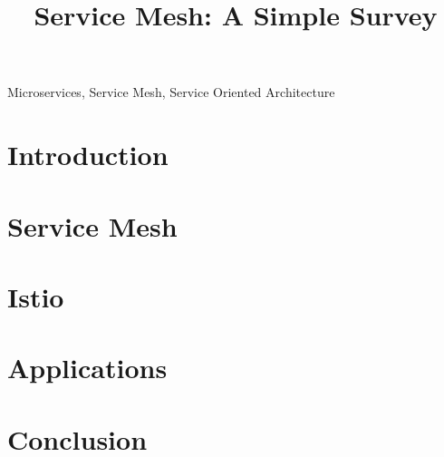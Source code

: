 \documentclass[conference]{IEEEtran}
\begin{document}
\title{Service Mesh: A Simple Survey}

\iffalse
\author{\IEEEauthorblockN{1\textsuperscript{st} Given Name Surname}
  \IEEEauthorblockA{\textit{dept. name of organization (of Aff.)} \\
  \textit{name of organization (of Aff.)}\\
  City, Country \\
  email address}
\and
  \IEEEauthorblockN{2\textsuperscript{nd} Given Name Surname}
  \IEEEauthorblockA{\textit{dept. name of organization (of Aff.)} \\
  \textit{name of organization (of Aff.)}\\
  City, Country \\
  email address}
\and
  \IEEEauthorblockN{3\textsuperscript{rd} Given Name Surname}
  \IEEEauthorblockA{\textit{dept. name of organization (of Aff.)} \\
  \textit{name of organization (of Aff.)}\\
  City, Country \\
  email address}
}
\fi

\maketitle

\begin{abstract}
\cite{li2019service}
\end{abstract}

\begin{IEEEkeywords}
  Microservices, Service Mesh, Service Oriented Architecture
\end{IEEEkeywords}

\section{Introduction} \label{sec:intro}

\section{Service Mesh} \label{sec:mesh}

\section{Istio} \label{sec:istio}

\section{Applications} \label{sec:app}

\section{Conclusion}



\end{document}
